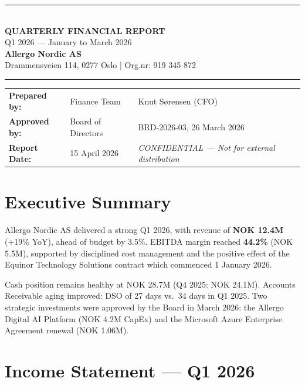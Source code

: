 \documentclass[a4paper,11pt]{article}
\begin{document}
\begin{center}
  {\color{brand}\rule{\textwidth}{3pt}}\\[14pt]
  {\color{brand}\Huge\bfseries QUARTERLY FINANCIAL REPORT}\\[6pt]
  {\Large Q1 2026 — January to March 2026}\\[6pt]
  {\large\bfseries Allergo Nordic AS}\\[4pt]
  {\normalsize Drammensveien 114, 0277 Oslo \quad | \quad Org.nr: 919 345 872}\\[14pt]
  {\color{brand}\rule{\textwidth}{3pt}}
\end{center}

\vspace{8pt}
\begin{center}
\begin{tabular}{lll}
  \textbf{Prepared by:} & Finance Team & Knut Sørensen (CFO) \\
  \textbf{Approved by:} & Board of Directors & BRD-2026-03, 26 March 2026 \\
  \textbf{Report Date:} & 15 April 2026 & \textit{CONFIDENTIAL — Not for external distribution} \\
\end{tabular}
\end{center}

\vspace{16pt}

\section{Executive Summary}

Allergo Nordic AS delivered a strong Q1 2026, with revenue of \textbf{NOK 12.4M} (+19\% YoY),
ahead of budget by 3.5\%. EBITDA margin reached \textbf{44.2\%} (NOK 5.5M), supported by
disciplined cost management and the positive effect of the Equinor Technology Solutions contract
which commenced 1 January 2026.

Cash position remains healthy at NOK 28.7M (Q4 2025: NOK 24.1M). Accounts Receivable aging
improved: DSO of 27 days vs.\ 34 days in Q1 2025. Two strategic investments were approved by
the Board in March 2026: the Allergo Digital AI Platform (NOK 4.2M CapEx) and the Microsoft
Azure Enterprise Agreement renewal (NOK 1.06M).

\section{Income Statement — Q1 2026}
\end{document}
